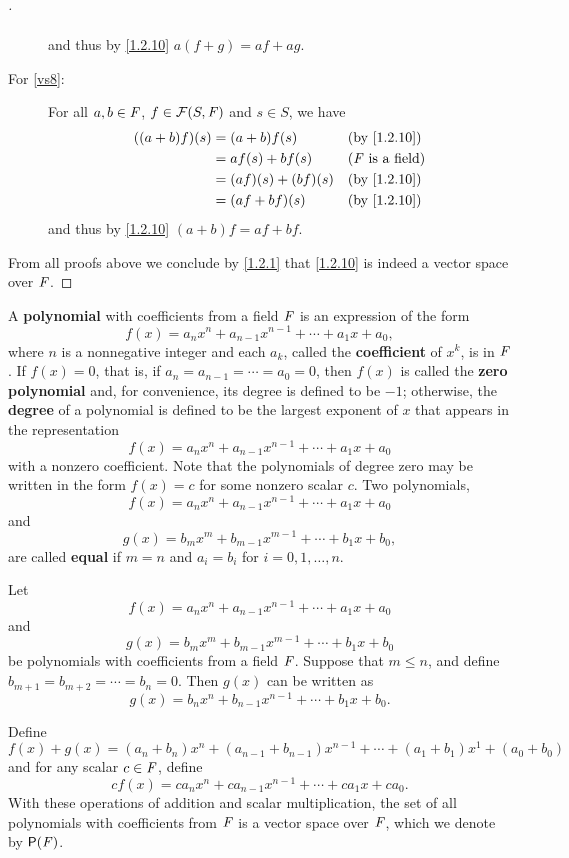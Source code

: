 \begin{proof}[]
\begin{description}
\begin{align*}
			\end{align*}
			and thus by \cref{1.2.10} \(a (f + g) = af + ag\).
		\item[For \ref{vs8}:]
			For all \(a, b \in \mathit{F}\), \(f \in \FS\) and \(s \in S\), we have
			\begin{align*}
				((a + b) f)(s) & = (a + b) f(s)      &  & \text{(by \cref{1.2.10})}  \\
				               & = af(s) + bf(s)     &  & \text{(\(\F\) is a field)} \\
				               & = (af)(s) + (bf)(s) &  & \text{(by \cref{1.2.10})}  \\
				               & = (af + bf)(s)      &  & \text{(by \cref{1.2.10})}
			\end{align*}
			and thus by \cref{1.2.10} \((a + b) f = af + bf\).
	\end{description}
	From all proofs above we conclude by \cref{1.2.1} that \cref{1.2.10} is indeed a vector space over \(\mathit{F}\).
\end{proof}

\begin{defn}\label{1.2.11}
	A \textbf{polynomial} with coefficients from a field \(\mathit{F}\) is an expression of the form
	\[
		f(x) = a_n x^n + a_{n - 1} x^{n - 1} + \cdots + a_1 x + a_0,
	\]
	where \(n\) is a nonnegative integer and each \(a_k\), called the \textbf{coefficient} of \(x^k\), is in \(\mathit{F}\).
	If \(f(x) = 0\), that is, if \(a_n = a_{n - 1} = \cdots = a_0 = 0\), then \(f(x)\) is called the \textbf{zero polynomial} and, for convenience, its degree is defined to be \(-1\);
	otherwise, the \textbf{degree} of a polynomial is defined to be the largest exponent of \(x\) that appears in the representation
	\[
		f(x) = a_n x^n + a_{n - 1} x^{n - 1} + \cdots + a_1 x + a_0
	\]
	with a nonzero coefficient.
	Note that the polynomials of degree zero may be written in the form \(f(x) = c\) for some nonzero scalar \(c\).
	Two polynomials,
	\[
		f(x) = a_n x^n + a_{n - 1} x^{n - 1} + \cdots + a_1 x + a_0
	\]
	and
	\[
		g(x) = b_m x^m + b_{m - 1} x^{m - 1} + \cdots + b_1 x + b_0,
	\]
	are called \textbf{equal} if \(m = n\) and \(a_i = b_i\) for \(i = 0, 1, \dots, n\).
\end{defn}

\begin{eg}\label{1.2.12}
	Let
	\[
		f(x) = a_n x^n + a_{n - 1} x^{n - 1} + \cdots + a_1 x + a_0
	\]
	and
	\[
		g(x) = b_m x^m + b_{m - 1} x^{m - 1} + \cdots + b_1 x + b_0
	\]
	be polynomials with coefficients from a field \(\mathit{F}\).
	Suppose that \(m \leq n\), and define \(b_{m + 1} = b_{m + 2} = \cdots = b_n = 0\).
	Then \(g(x)\) can be written as
	\[
		g(x) = b_n x^n + b_{n - 1} x^{n - 1} + \cdots + b_1 x + b_0.
	\]

	Define
	\[
		f(x) + g(x) = (a_n + b_n) x^n + (a_{n - 1} + b_{n - 1}) x^{n - 1} + \cdots + (a_1 + b_1) x^1 + (a_0 + b_0)
	\]
	and for any scalar \(c \in \mathit{F}\), define
	\[
		cf(x) = ca_n x^n + ca_{n - 1} x^{n - 1} + \cdots + ca_1 x + ca_0.
	\]
	With these operations of addition and scalar multiplication, the set of all polynomials with coefficients from \(\mathit{F}\) is a vector space over \(\mathit{F}\), which we denote by \(\ps{\F}\).
\end{eg}

